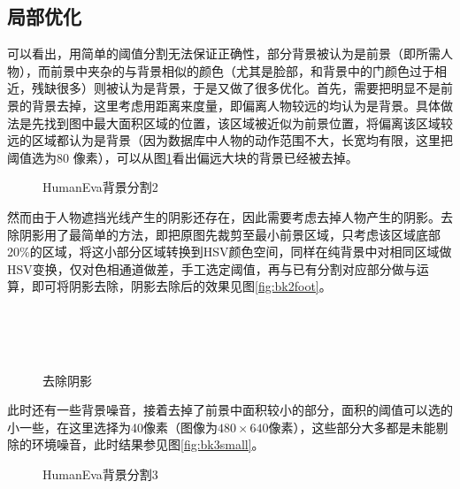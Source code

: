 \subsection{局部优化}
可以看出，用简单的阈值分割无法保证正确性，部分背景被认为是前景（即所需人物），而前景中夹杂的与背景相似的颜色（尤其是脸部，和背景中的门颜色过于相近，残缺很多）则被认为是背景，于是又做了很多优化。首先，需要把明显不是前景的背景去掉，这里考虑用距离来度量，即偏离人物较远的均认为是背景。具体做法是先找到图中最大面积区域的位置，该区域被近似为前景位置，将偏离该区域较远的区域都认为是背景（因为数据库中人物的动作范围不大，长宽均有限，这里把阈值选为80 像素），可以从图\ref{fig:bkfar}看出偏远大块的背景已经被去掉。

\begin{figure}[htbp]
  \centering
  \hspace{1cm}
  \caption{HumanEva背景分割2}\label{fig:bkfar}
\end{figure}

然而由于人物遮挡光线产生的阴影还存在，因此需要考虑去掉人物产生的阴影。去除阴影用了最简单的方法，即把原图先裁剪至最小前景区域，只考虑该区域底部20\%的区域，将这小部分区域转换到HSV颜色空间，同样在纯背景中对相同区域做HSV变换，仅对色相通道做差，手工选定阈值，再与已有分割对应部分做与运算，即可将阴影去除，阴影去除后的效果见图\ref{fig:bk2foot}。

\begin{figure}[htbp]
  \centering
  \hspace{.5cm}
  \\
  \hspace{.5cm}
  \\
  \\
  \caption{去除阴影}
\end{figure}

此时还有一些背景噪音，接着去掉了前景中面积较小的部分，面积的阈值可以选的小一些，在这里选择为40像素（图像为$480\times 640$像素），这些部分大多都是未能剔除的环境噪音，此时结果参见图\ref{fig:bk3small}。

\begin{figure}[htbp]
  \centering
  \hspace{1cm}
  \caption{HumanEva背景分割3}
\end{figure}

